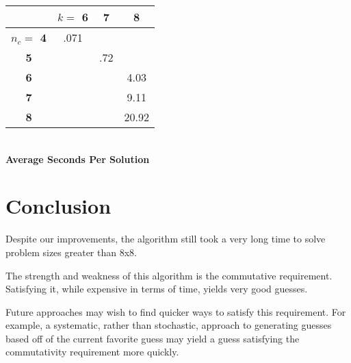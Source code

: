 \documentclass[11pt,twocolumn]{article}
\begin{document}
\begin{center}
\begin{tabular}{|c|c|c|c|}
\hline
        &\bf $k= $ 6 &\bf 7 &\bf 8 \\
\hline
\bf $n_c = $ 4 & .071   &   &   \\
\hline
\bf 5       &       & .72&   \\
\hline
\bf 6       &       &   &4.03 \\
\hline
\bf 7       &       &   & 9.11 \\
\hline
\bf 8       &       &   & 20.92 \\
\hline
\end{tabular}\\
\bf Average Seconds Per Solution  \rm
\end{center}




\section{Conclusion}

Despite our improvements, the algorithm still took a very long time to solve problem sizes greater than 8x8. %

The strength and weakness of this algorithm is the commutative requirement. Satisfying it, while expensive in terms of time, yields very good guesses. 

Future approaches may wish to find quicker ways to satisfy this requirement. For example, a systematic, rather than stochastic, approach to generating guesses based off of the current favorite  guess may yield a guess satisfying the commutativity requirement more quickly.
\end{document}
